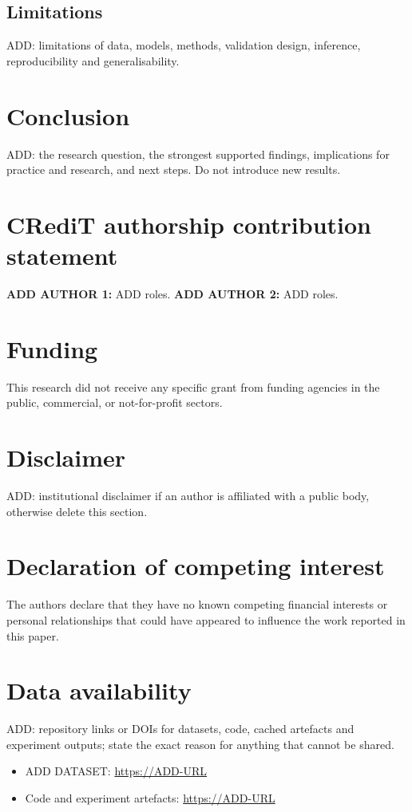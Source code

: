 \documentclass[final,5p,twocolumn]{elsarticle}
\begin{document}
\subsection{Limitations}
\label{subsec:limitations}
ADD: limitations of data, models, methods, validation design, inference, reproducibility and generalisability.


\section{Conclusion}
\label{sec:conclusion}
ADD: the research question, the strongest supported findings, implications for practice and research, and next steps. Do not introduce new results.


\section*{CRediT authorship contribution statement}
\textbf{ADD AUTHOR 1:} ADD roles. \textbf{ADD AUTHOR 2:} ADD roles.

\section*{Funding}
This research did not receive any specific grant from funding agencies in the public, commercial, or not-for-profit sectors.

\section*{Disclaimer}
ADD: institutional disclaimer if an author is affiliated with a public body, otherwise delete this section.

\section*{Declaration of competing interest}
The authors declare that they have no known competing financial interests or personal relationships that could have appeared to influence the work reported in this paper.

\section*{Data availability}
ADD: repository links or DOIs for datasets, code, cached artefacts and experiment outputs; state the exact reason for anything that cannot be shared.
\begin{itemize}
    \item ADD DATASET: \url{https://ADD-URL}
    \item Code and experiment artefacts: \url{https://ADD-URL}
\end{itemize}
\end{document}
